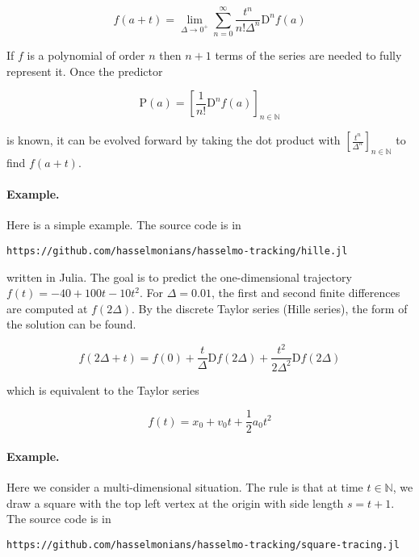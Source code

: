 \documentclass[]{article}
\begin{document}
\begin{equation}
	f(a + t) = \lim_{\Delta \rightarrow 0^+} \sum_{n=0}^{\infty} \frac{t^n}{n! \Delta^n} \mathrm{D}^n f(a)
\end{equation}

If $f$ is a polynomial of order $n$ then $n+1$ terms of the series are needed to fully represent it. Once the predictor

\begin{equation}
	\mathrm{P}(a) = \left[ \frac{1}{n!} \mathrm{D}^n f(a) \right]_{n \in \mathbb{N}}
\end{equation}

is known, it can be evolved forward by taking the dot product with $\left[ \frac{t^n}{\Delta^n} \right]_{n \in \mathbb{N}}$ to find $f(a + t)$.

\paragraph{Example.} Here is a simple example. The source code is in

\texttt{https://github.com/hasselmonians/hasselmo-tracking/hille.jl}

written in Julia. The goal is to predict the one-dimensional trajectory $f(t) = -40 + 100 t - 10 t^2$. For $\Delta = 0.01$, the first and second finite differences are computed at $f(2\Delta)$. By the discrete Taylor series (Hille series), the form of the solution can be found.

\begin{equation}
	f(2\Delta + t) = f(0) + \frac{t}{\Delta} \mathrm{D}f(2\Delta) + \frac{t^2}{2 \Delta^2} \mathrm{D}f(2\Delta)
\end{equation}

which is equivalent to the Taylor series

\begin{equation}
	f(t) = x_0 + v_0 t + \frac{1}{2} a_0 t^2
\end{equation}

\paragraph{Example.} Here we consider a multi-dimensional situation. The rule is that at time $t \in \mathbb{N}$, we draw a square with the top left vertex at the origin with side length $s = t + 1$. The source code is in

\texttt{https://github.com/hasselmonians/hasselmo-tracking/square-tracing.jl}
\end{document}
